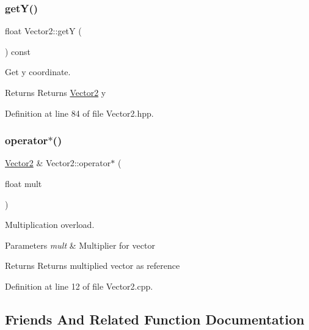 \subsubsection{\texorpdfstring{get\+Y()}{getY()}}
{\footnotesize\ttfamily float Vector2\+::getY (\begin{DoxyParamCaption}{ }\end{DoxyParamCaption}) const\hspace{0.3cm}{\ttfamily [inline]}}



Get y coordinate. 

\begin{DoxyReturn}{Returns}
Returns \mbox{\hyperlink{classVector2}{Vector2}} y 
\end{DoxyReturn}


Definition at line 84 of file Vector2.\+hpp.

\mbox{\label{classVector2_a2b00999bdfe377965239a8f44d7c192c}} 
\subsubsection{\texorpdfstring{operator$\ast$()}{operator*()}}
{\footnotesize\ttfamily \mbox{\hyperlink{classVector2}{Vector2}} \& Vector2\+::operator$\ast$ (\begin{DoxyParamCaption}\item[{float}]{mult }\end{DoxyParamCaption})}



Multiplication overload. 


\begin{DoxyParams}{Parameters}
{\em mult} & Multiplier for vector \\
\hline
\end{DoxyParams}
\begin{DoxyReturn}{Returns}
Returns multiplied vector as reference 
\end{DoxyReturn}


Definition at line 12 of file Vector2.\+cpp.



\subsection{Friends And Related Function Documentation}
\mbox{\label{classVector2_abed1d1283eebca3cc8248543d219a937}} 
